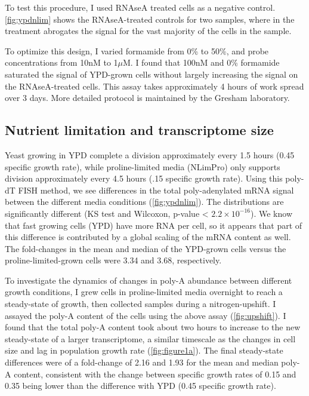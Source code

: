 To test this procedure, I used RNAseA treated cells as a negative
control.
\autoref{fig:ypdnlim} shows the RNAseA-treated controls for two
samples, where in the treatment abrogates the signal for the vast
majority of the cells in the sample.

To optimize this design, I varied formamide from 0\% to 50\%, and
probe concentrations from 10nM to 1$\mu$M. I found that 100nM and 0\%
formamide saturated the signal of YPD-grown cells without largely
increasing the signal on the RNAseA-treated cells.
This assay takes approximately 4 hours of work spread over 3 days.
More detailed protocol is maintained by the Gresham laboratory.


%
%
%
\subsection{Nutrient limitation and transcriptome size}
%
%
%

Yeast growing in
YPD complete a division approximately every 1.5 hours (0.45 specific
growth rate), while 
proline-limited media (NLimPro) only supports division approximately
every 4.5 hours (.15 specific growth rate). 
Using this poly-dT FISH method, we see differences in the total 
poly-adenylated mRNA signal between the different media conditions
(\autoref{fig:ypdnlim}).
The distributions are significantly
different (KS test and Wilcoxon, p-value < $2.2 \times 10^{-16}$).
We know that fast growing cells (YPD) have more RNA per cell, so it
appears that part of this difference is contributed by a global
scaling of the mRNA content as well.
The fold-changes in the mean and median of the YPD-grown cells versus
the proline-limited-grown cells were 3.34 and 3.68, respectively.


To investigate the dynamics of changes in poly-A abundance between 
different growth conditions, I grew cells in proline-limited media
overnight to reach a steady-state of growth, then collected samples
during a nitrogen-upshift.
I assayed the poly-A content of the cells using the above assay
(\autoref{fig:upshift}).
I found that the total poly-A content took about two hours to increase
to the new steady-state of a larger transcriptome, a similar timescale
as the changes in cell size and lag in population growth rate
(\autoref{fig:figure1a}).
The final steady-state differences were of a fold-change of 2.16 and
1.93 for the mean and median poly-A content, consistent with the
change between specific growth rates of 0.15 and 0.35 being lower
than the difference with YPD (0.45 specific growth rate). 


